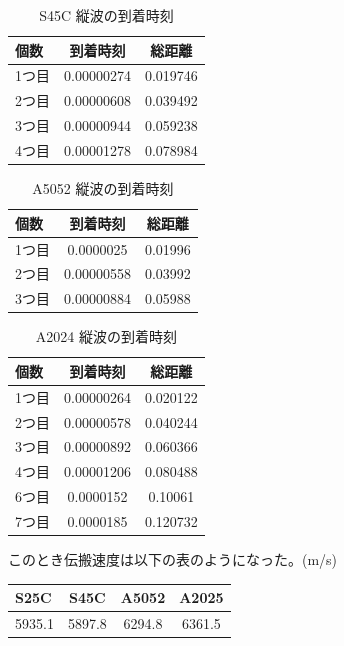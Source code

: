 \documentclass[uplatex,dvipdfmx,titlepage]{jsarticle}
\begin{document}
\begin{table}[H]
    \centering
    \caption{S45C 縦波の到着時刻}
    \begin{tabular}{lcc}
    \hline
    個数 & 到着時刻 & 総距離 \\ \hline
    1つ目 & 0.00000274 & 0.019746 \\
    2つ目 & 0.00000608 & 0.039492 \\
    3つ目 & 0.00000944 & 0.059238 \\
    4つ目 & 0.00001278 & 0.078984 \\ \hline
    \end{tabular}
\end{table}

\begin{table}[H]
    \centering
    \caption{A5052 縦波の到着時刻}
    \begin{tabular}{lcc}
    \hline
    個数 & 到着時刻 & 総距離 \\ \hline
    1つ目 & 0.0000025  & 0.01996 \\
    2つ目 & 0.00000558 & 0.03992 \\
    3つ目 & 0.00000884 & 0.05988 \\ \hline
    \end{tabular}
\end{table}

\begin{table}[H]
    \centering
    \caption{A2024 縦波の到着時刻}
    \begin{tabular}{lcc}
    \hline
    個数 & 到着時刻 & 総距離 \\ \hline
    1つ目 & 0.00000264 & 0.020122 \\
    2つ目 & 0.00000578 & 0.040244 \\
    3つ目 & 0.00000892 & 0.060366 \\
    4つ目 & 0.00001206 & 0.080488 \\
    6つ目 & 0.0000152  & 0.10061  \\
    7つ目 & 0.0000185  & 0.120732 \\ \hline
    \end{tabular}
\end{table}

このとき伝搬速度は以下の表のようになった。(m/s)
\begin{table}[H]
    \centering
    \begin{tabular}{lccc}
    \hline
    S25C & S45C & A5052 & A2025 \\ \hline
    5935.1 & 5897.8 & 6294.8 & 6361.5 \\ \hline
    \end{tabular}
\end{table}
\end{document}
